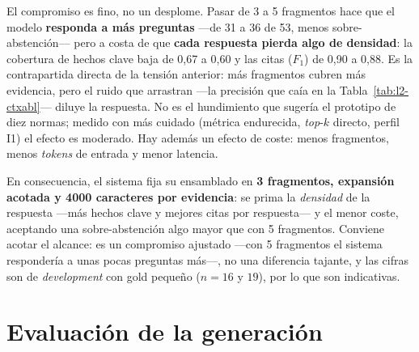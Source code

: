 El compromiso es fino, no un desplome. Pasar de 3 a 5 fragmentos hace que el modelo \textbf{responda a más preguntas} —de 31 a 36 de 53, menos sobre-abstención— pero a costa de que \textbf{cada respuesta pierda algo de densidad}: la cobertura de hechos clave baja de 0,67 a 0,60 y las citas ($F_1$) de 0,90 a 0,88. Es la contrapartida directa de la tensión anterior: más fragmentos cubren más evidencia, pero el ruido que arrastran —la precisión que caía en la Tabla~\ref{tab:l2-ctxabl}— diluye la respuesta. No es el hundimiento que sugería el prototipo de diez normas; medido con más cuidado (métrica endurecida, \emph{top}-$k$ directo, perfil I1) el efecto es moderado. Hay además un efecto de coste: menos fragmentos, menos \emph{tokens} de entrada y menor latencia.

En consecuencia, el sistema fija su ensamblado en \textbf{3 fragmentos, expansión acotada y 4000 caracteres por evidencia}: se prima la \emph{densidad} de la respuesta —más hechos clave y mejores citas por respuesta— y el menor coste, aceptando una sobre-abstención algo mayor que con 5 fragmentos. Conviene acotar el alcance: es un compromiso ajustado —con 5 fragmentos el sistema respondería a unas pocas preguntas más—, no una diferencia tajante, y las cifras son de \emph{development} con gold pequeño ($n=16$ y $19$), por lo que son indicativas.

\section{Evaluación de la generación}
\label{sec:eval-generacion}

